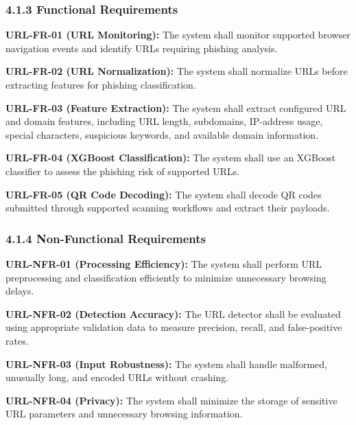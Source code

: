 \documentclass[12pt,a4paper]{report}
\begin{document}
\subsubsection*{4.1.3 Functional Requirements}

\textbf{URL-FR-01 (URL Monitoring):} The system shall monitor supported browser navigation events and identify URLs requiring phishing analysis.\par

\textbf{URL-FR-02 (URL Normalization):} The system shall normalize URLs before extracting features for phishing classification.\par

\textbf{URL-FR-03 (Feature Extraction):} The system shall extract configured URL and domain features, including URL length, subdomains, IP-address usage, special characters, suspicious keywords, and available domain information.\par

\textbf{URL-FR-04 (XGBoost Classification):} The system shall use an XGBoost classifier to assess the phishing risk of supported URLs.\par

\textbf{URL-FR-05 (QR Code Decoding):} The system shall decode QR codes submitted through supported scanning workflows and extract their payloads.\par

\subsubsection*{4.1.4 Non-Functional Requirements}

\textbf{URL-NFR-01 (Processing Efficiency):} The system shall perform URL preprocessing and classification efficiently to minimize unnecessary browsing delays.\par

\textbf{URL-NFR-02 (Detection Accuracy):} The URL detector shall be evaluated using appropriate validation data to measure precision, recall, and false-positive rates.\par

\textbf{URL-NFR-03 (Input Robustness):} The system shall handle malformed, unusually long, and encoded URLs without crashing.\par

\textbf{URL-NFR-04 (Privacy):} The system shall minimize the storage of sensitive URL parameters and unnecessary browsing information.\par
\end{document}
